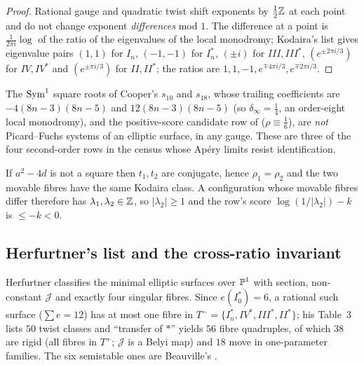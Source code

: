 \begin{proof}
Rational gauge and quadratic twist shift exponents by $\tfrac12\mathbb{Z}$ at each point
and do not change exponent \emph{differences} mod $1$. The difference at a point
is $\tfrac1{2\pi i}\log$ of the ratio of the eigenvalues of the local monodromy;
Kodaira's list gives eigenvalue pairs $(1,1)$ for $I_n$, $(-1,-1)$ for $I_n^*$,
$(\pm i)$ for $III,III^*$, $(e^{\pm2\pi i/3})$ for $IV,IV^*$ and
$(e^{\pm\pi i/3})$ for $II,II^*$; the ratios are $1,1,-1,e^{\mp 4\pi i/3},
e^{\mp2\pi i/3}$.
\end{proof}

\begin{corollary}\label{cor:excluded}
\Proved{} The $\operatorname{Sym}^1$ square roots of Cooper's $s_{10}$ and $s_{18}$, whose
trailing coefficients are $-4(8n-3)(8n-5)$ and $12(8n-3)(8n-5)$
\textup{(}so $\delta_\infty=\tfrac14$, an order-eight local monodromy\textup{)},
and the positive-score candidate row of \cite[\S4.4]{ProjNoncong}
\textup{(}$\rho\equiv\tfrac16$\textup{)}, are \emph{not} Picard--Fuchs systems of
an elliptic surface, in any gauge. These are three of the four second-order rows
in the census whose Apéry limits resist identification.
\end{corollary}

\begin{corollary}\label{cor:galois}
\Proved{} If $a^2-4d$ is not a square then $t_1,t_2$ are conjugate, hence
$\rho_1=\rho_2$ and the two movable fibres have the same Kodaira class. A
configuration whose movable fibres differ therefore has
$\lambda_1,\lambda_2\in\mathbb{Z}$, so $|\lambda_2|\ge1$ and the row's score
$\log(1/|\lambda_2|)-k$ is $\le-k<0$.
\end{corollary}

\subsection{Herfurtner's list and the cross-ratio invariant}

Herfurtner \cite{Herfurtner1991} classifies the minimal elliptic surfaces over
$\mathbb{P}^1$ with section, non-constant $\mathcal J$ and exactly four singular
fibres. Since $e(I_0^*)=6$, a rational such surface ($\sum e=12$) has at most one
fibre in $T^-=\{I^*_n,IV^*,III^*,II^*\}$; his Table~3 lists $50$ twist classes and
``transfer of $*$'' yields $56$ fibre quadruples, of which $38$ are rigid (all
fibres in $T^+$; $\mathcal J$ is a Belyi map) and $18$ move in one-parameter
families. The six semistable ones are Beauville's \cite{Beauville1982}.

